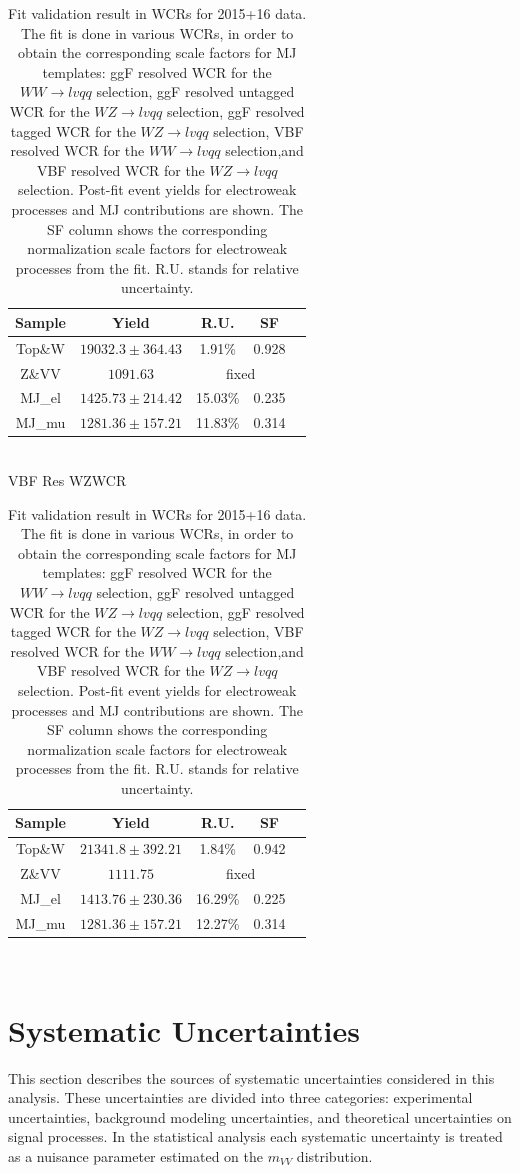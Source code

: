 \begin{table}[ht]
\begin{tabular}{|c|c|c|c|c|}
      \hline
     Sample    & Yield   & R.U.    & SF    \\ \hline
     Top\&W    & $19032.3\pm 364.43$  & 1.91\%  & 0.928  \\ \hline
     Z\&VV     & $1091.63$ & \multicolumn{2}{c|}{fixed} \\ \hline
     MJ\_el    & $1425.73\pm 214.42$  & 15.03\%  &0.235   \\ \hline
     MJ\_mu    & $1281.36\pm 157.21$  & 11.83\%  &0.314   \\ \hline
     \end{tabular}\hfill%
     \\
     \large{VBF Res WZWCR\\ }
     \begin{tabular}{|c|c|c|c|c|}
      \hline
     Sample    & Yield   & R.U.    & SF    \\ \hline
     Top\&W    & $21341.8\pm 392.21$  & 1.84\%  & 0.942  \\ \hline
     Z\&VV     & $1111.75$ & \multicolumn{2}{c|}{fixed} \\ \hline
     MJ\_el    & $1413.76\pm 230.36$  & 16.29\%  &0.225   \\ \hline
     MJ\_mu    & $1281.36\pm 157.21$  & 12.27\%  &0.314   \\ \hline
     \end{tabular}\hfill%
     \\
\caption{\label{tab:template_validation_CR} Fit validation result in WCRs for 2015+16 data. 
The fit is done in various WCRs, in order to obtain the corresponding scale factors for MJ templates: ggF resolved WCR for the $WW\to lvqq$ selection, ggF resolved untagged WCR for the $WZ\to lvqq$ selection,  ggF resolved tagged WCR for the $WZ\to lvqq$ selection,  VBF resolved WCR for the $WW\to lvqq$ selection,and VBF resolved WCR for the $WZ\to lvqq$ selection. Post-fit event yields for electroweak processes and MJ contributions are shown. The SF column shows the corresponding normalization scale factors for electroweak processes from the fit.
R.U. stands for relative uncertainty.
}
\end{table}



\chapter{Systematic Uncertainties}

This section describes the sources of systematic uncertainties considered in this analysis. These uncertainties are divided into three categories: experimental uncertainties, background modeling uncertainties, and theoretical uncertainties on signal processes. In the statistical analysis each systematic uncertainty is treated as a nuisance parameter estimated on the $m_{VV}$ distribution.

